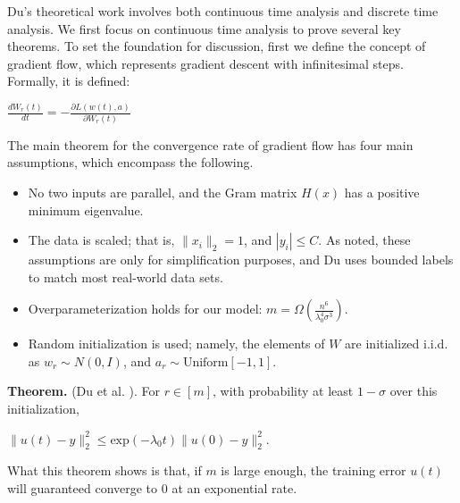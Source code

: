 \documentclass{article}
\begin{document}
Du's theoretical work involves both continuous time analysis and discrete time analysis. We first focus on continuous time analysis to prove several key theorems. To set the foundation for discussion, first we define the concept of gradient flow, which represents gradient descent with infinitesimal steps. Formally, it is defined:
\begin{center}
    $\frac{d W_r(t)}{dt} = -\frac{\partial L(w(t),a)}{\partial W_r(t)}$
\end{center}

The main theorem for the convergence rate of gradient flow has four main assumptions, which encompass the following.
\begin{itemize}
\item No two inputs are parallel, and the Gram matrix $H(x)$ has a positive minimum eigenvalue.
\item The data is scaled; that is, $\|x_i\|_{2} = 1$, and $|y_i|\leq C$. As noted, these assumptions are only for simplification purposes, and Du uses bounded labels to match most real-world data sets.  
\item Overparameterization holds for our model: $m=\Omega(\frac{n^6}{\lambda^4_0 \sigma^3})$.
\item Random initialization is used; namely, the elements of $W$ are initialized i.i.d. as $w_r\sim N(0,I)$, and $a_r \sim \text{Uniform}[{-1,1}]$.
\end{itemize}

\textbf{Theorem.} (Du et al. \cite{SimonDu}). For $r \in [m]$, with probability at least $1-\sigma$ over this initialization,
\begin{center}
    $\|u(t)-y\|^2_2 \leq \text{exp}(-\lambda_0 t)\|u(0)-y\|^2_2$.
\end{center}

What this theorem shows is that, if $m$ is large enough, the training error $u(t)$ will guaranteed converge to 0 at an exponential rate. 
\end{document}
